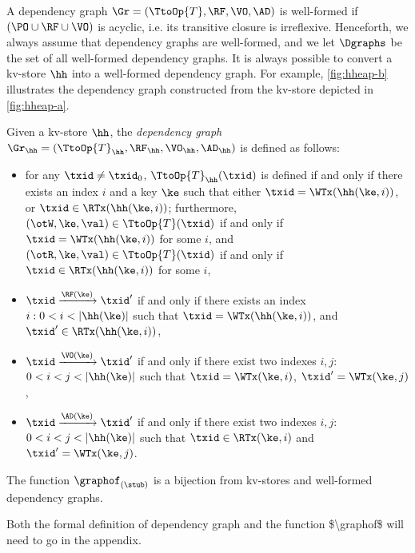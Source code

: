 A dependency graph $\Gr = (\TtoOp{T}, \RF, \VO, \AD)$ is well-formed if 
$(\PO \cup \RF \cup \VO)$ is acyclic, i.e. its transitive closure is irreflexive. 
Henceforth, we always assume that dependency graphs are well-formed, 
and we let $\Dgraphs$ be the set of all well-formed dependency graphs.
It is always possible to convert a kv-store $\hh$ into a well-formed dependency 
graph. For example, \cref{fig:hheap-b} illustrates the dependency graph constructed 
from the kv-store depicted in \cref{fig:hheap-a}.

\begin{definition}
\label{def:kv2graph}
Given a kv-store $\hh$, the \emph{dependency graph} $\Gr_{\hh} = (\TtoOp{T}_{\hh}, \RF_{\hh}, 
\VO_{\hh}, \AD_{\hh})$ is defined as follows: 
\begin{itemize}
\item for any $\txid \neq \txid_0$, $\TtoOp{T}_{\hh}(\txid)$ is defined if and only if there exists an index $i$ and a key 
$\ke$ such that either $\txid = \WTx(\hh(\ke, i))$, or $\txid \in \RTx(\hh(\ke,i))$; furthermore, 
$(\otW, \ke, \val) \in \TtoOp{T}(\txid)$ if and only 
if $\txid = \WTx(\hh(\ke, i))$ for some $i$, and 
$(\otR, \ke, \val) \in \TtoOp{T}(\txid)$ if and only if $\txid \in \RTx(\hh(\ke, i))$ for some $i$, 
\item $\txid \xrightarrow{\RF(\ke)} \txid'$ if and only if there exists an index $i: 0 < i < \lvert \hh(\ke) \rvert$ 
such that $\txid = \WTx(\hh(\ke, i))$, and $\txid' \in \RTx(\hh(\ke, i))$, 
\item $\txid \xrightarrow{\VO(\ke)} \txid'$ if and only if there exist two indexes $i,j$: $0 < i < j < \lvert \hh(\ke) \rvert$ 
such that $\txid = \WTx(\ke, i)$, $\txid' = \WTx(\ke, j)$, 
\item $\txid \xrightarrow{\AD(\ke)} \txid'$ if and only if there exist two indexes $i,j$: $0 < i < j < \lvert \hh(\ke) \rvert$ 
such that $\txid \in \RTx(\ke, i)$ and $\txid' = \WTx(\ke, j)$.
\end{itemize}
\end{definition}

\begin{theorem}
\label{thm:kv2graph}
The function $\graphof_{(\stub)}$ is a bijection from kv-stores and well-formed dependency graphs.
\end{theorem}

\ac{Both the formal definition of dependency graph and the function $\graphof$ will need to go in the appendix.}
